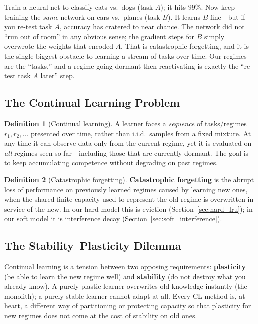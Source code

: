 \documentclass[11pt,a4paper]{article}
\theoremstyle{definition}
\newtheorem{definition}{Definition}[section]
\theoremstyle{plain}
\begin{document}
\begin{intuition}[title={The classic demo, in one paragraph}]
Train a neural net to classify cats vs.\ dogs (task $A$); it hits $99\%$. Now keep
training the \emph{same} network on cars vs.\ planes (task $B$). It learns $B$
fine---but if you re-test task $A$, accuracy has cratered to near chance. The
network did not ``run out of room'' in any obvious sense; the gradient steps for
$B$ simply overwrote the weights that encoded $A$. That is catastrophic
forgetting, and it is the single biggest obstacle to learning a stream of tasks
over time. Our regimes are the ``tasks,'' and a regime going dormant then
reactivating is exactly the ``re-test task $A$ later'' step.
\end{intuition}

\subsection{The Continual Learning Problem}

\begin{definition}[Continual learning]
A learner faces a \emph{sequence} of tasks/regimes $r_1, r_2, \ldots$ presented
over time, rather than i.i.d.\ samples from a fixed mixture. At any time it can
observe data only from the current regime, yet it is evaluated on \emph{all}
regimes seen so far---including those that are currently dormant. The goal is to
keep accumulating competence without degrading on past regimes.
\end{definition}

\begin{definition}[Catastrophic forgetting]
\textbf{Catastrophic forgetting} is the abrupt loss of performance on previously
learned regimes caused by learning new ones, when the shared finite capacity used
to represent the old regime is overwritten in service of the new. In our hard
model this is eviction (Section~\ref{sec:hard_lru}); in our soft model it is
interference decay (Section~\ref{sec:soft_interference}).
\end{definition}

\subsection{The Stability--Plasticity Dilemma}

\begin{intuition}
Continual learning is a tension between two opposing requirements:
\textbf{plasticity} (be able to learn the new regime well) and \textbf{stability}
(do not destroy what you already know). A purely plastic learner overwrites old
knowledge instantly (the monolith); a purely stable learner cannot adapt at all.
Every CL method is, at heart, a different way of partitioning or protecting
capacity so that plasticity for new regimes does not come at the cost of stability
on old ones.
\end{intuition}
\end{document}
